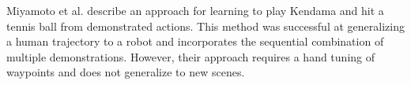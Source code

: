 Miyamoto et al.  describe an approach for learning to play Kendama and hit a tennis ball from demonstrated actions. 
This method was successful at generalizing a human trajectory to a robot and incorporates the sequential combination of multiple demonstrations.
However, their approach requires a hand tuning of waypoints and does not generalize to new scenes.

